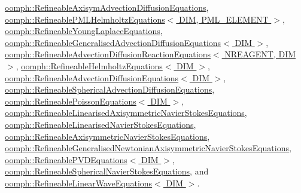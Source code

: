 \hyperlink{classoomph_1_1RefineableAxisymAdvectionDiffusionEquations_a1027fd155ab295492c9e4f4859e91b30}{oomph\+::\+Refineable\+Axisym\+Advection\+Diffusion\+Equations}, \hyperlink{classoomph_1_1RefineablePMLHelmholtzEquations_ad51cfaf01ba8ca49842796d3f906877c}{oomph\+::\+Refineable\+P\+M\+L\+Helmholtz\+Equations$<$ D\+I\+M, P\+M\+L\+\_\+\+E\+L\+E\+M\+E\+N\+T $>$}, \hyperlink{classoomph_1_1RefineableYoungLaplaceEquations_ab8d8c6010331d8076a5d6369d331eb4d}{oomph\+::\+Refineable\+Young\+Laplace\+Equations}, \hyperlink{classoomph_1_1RefineableGeneralisedAdvectionDiffusionEquations_a097fa9a13ecaebe0c3801c98a057d5ec}{oomph\+::\+Refineable\+Generalised\+Advection\+Diffusion\+Equations$<$ D\+I\+M $>$}, \hyperlink{classoomph_1_1RefineableAdvectionDiffusionReactionEquations_aaebce9418da050917be3deb004adf7c7}{oomph\+::\+Refineable\+Advection\+Diffusion\+Reaction\+Equations$<$ N\+R\+E\+A\+G\+E\+N\+T, D\+I\+M $>$}, \hyperlink{classoomph_1_1RefineableHelmholtzEquations_ae3981b8ad03d951b0d661d223ad8e560}{oomph\+::\+Refineable\+Helmholtz\+Equations$<$ D\+I\+M $>$}, \hyperlink{classoomph_1_1RefineableAdvectionDiffusionEquations_ae28af2d25f78d02a4cbe6b382dcc9546}{oomph\+::\+Refineable\+Advection\+Diffusion\+Equations$<$ D\+I\+M $>$}, \hyperlink{classoomph_1_1RefineableSphericalAdvectionDiffusionEquations_ac43262d025548fc9063c58529bd1e33f}{oomph\+::\+Refineable\+Spherical\+Advection\+Diffusion\+Equations}, \hyperlink{classoomph_1_1RefineablePoissonEquations_a8050a73d9e6450e2b861b3d840f5f6ec}{oomph\+::\+Refineable\+Poisson\+Equations$<$ D\+I\+M $>$}, \hyperlink{classoomph_1_1RefineableLinearisedAxisymmetricNavierStokesEquations_ad15973ab4c2e2a53c6356b70ef954958}{oomph\+::\+Refineable\+Linearised\+Axisymmetric\+Navier\+Stokes\+Equations}, \hyperlink{classoomph_1_1RefineableLinearisedNavierStokesEquations_adc7caa7e2d2f103bc4dc9f9ed83943f4}{oomph\+::\+Refineable\+Linearised\+Navier\+Stokes\+Equations}, \hyperlink{classoomph_1_1RefineableAxisymmetricNavierStokesEquations_ad4db711b6d0357a3b008624d68b3b1ba}{oomph\+::\+Refineable\+Axisymmetric\+Navier\+Stokes\+Equations}, \hyperlink{classoomph_1_1RefineableGeneralisedNewtonianAxisymmetricNavierStokesEquations_a6858f80eb16799bc4bfc844e0e297432}{oomph\+::\+Refineable\+Generalised\+Newtonian\+Axisymmetric\+Navier\+Stokes\+Equations}, \hyperlink{classoomph_1_1RefineablePVDEquations_a1e51d4ea46f49c62441425bc3883a589}{oomph\+::\+Refineable\+P\+V\+D\+Equations$<$ D\+I\+M $>$}, \hyperlink{classoomph_1_1RefineableSphericalNavierStokesEquations_ae0b6940ca1e05e042dae71b185e995b5}{oomph\+::\+Refineable\+Spherical\+Navier\+Stokes\+Equations}, and \hyperlink{classoomph_1_1RefineableLinearWaveEquations_af5b91e3507fc1ef71d9e1e1d9d0b4fe2}{oomph\+::\+Refineable\+Linear\+Wave\+Equations$<$ D\+I\+M $>$}.




